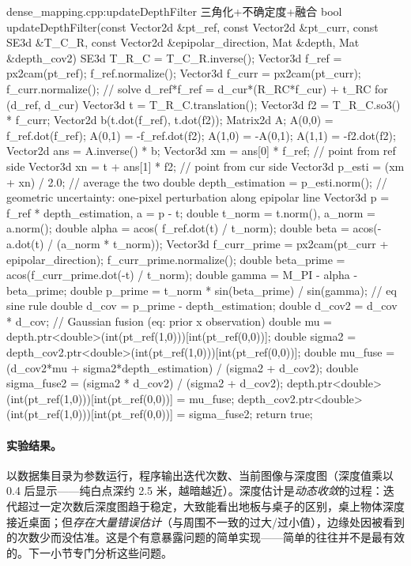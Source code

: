 \begin{codebox}[C++]{dense\_mapping.cpp:updateDepthFilter 三角化+不确定度+融合}
bool updateDepthFilter(const Vector2d &pt_ref, const Vector2d &pt_curr,
    const SE3d &T_C_R, const Vector2d &epipolar_direction,
    Mat &depth, Mat &depth_cov2) {
  SE3d T_R_C = T_C_R.inverse();
  Vector3d f_ref  = px2cam(pt_ref);  f_ref.normalize();
  Vector3d f_curr = px2cam(pt_curr); f_curr.normalize();
  // solve d_ref*f_ref = d_cur*(R_RC*f_cur) + t_RC  for (d_ref, d_cur)
  Vector3d t  = T_R_C.translation();
  Vector3d f2 = T_R_C.so3() * f_curr;
  Vector2d b(t.dot(f_ref), t.dot(f2));
  Matrix2d A;
  A(0,0) = f_ref.dot(f_ref); A(0,1) = -f_ref.dot(f2);
  A(1,0) = -A(0,1);          A(1,1) = -f2.dot(f2);
  Vector2d ans = A.inverse() * b;
  Vector3d xm = ans[0] * f_ref;          // point from ref side
  Vector3d xn = t + ans[1] * f2;         // point from cur side
  Vector3d p_esti = (xm + xn) / 2.0;     // average the two
  double depth_estimation = p_esti.norm();
  // geometric uncertainty: one-pixel perturbation along epipolar line
  Vector3d p = f_ref * depth_estimation, a = p - t;
  double t_norm = t.norm(), a_norm = a.norm();
  double alpha = acos( f_ref.dot(t) / t_norm);
  double beta  = acos(-a.dot(t) / (a_norm * t_norm));
  Vector3d f_curr_prime = px2cam(pt_curr + epipolar_direction);
  f_curr_prime.normalize();
  double beta_prime = acos(f_curr_prime.dot(-t) / t_norm);
  double gamma   = M_PI - alpha - beta_prime;
  double p_prime = t_norm * sin(beta_prime) / sin(gamma);  // eq sine rule
  double d_cov   = p_prime - depth_estimation;
  double d_cov2  = d_cov * d_cov;
  // Gaussian fusion (eq: prior x observation)
  double mu     = depth.ptr<double>(int(pt_ref(1,0)))[int(pt_ref(0,0))];
  double sigma2 = depth_cov2.ptr<double>(int(pt_ref(1,0)))[int(pt_ref(0,0))];
  double mu_fuse     = (d_cov2*mu + sigma2*depth_estimation) / (sigma2 + d_cov2);
  double sigma_fuse2 = (sigma2 * d_cov2) / (sigma2 + d_cov2);
  depth.ptr<double>(int(pt_ref(1,0)))[int(pt_ref(0,0))]      = mu_fuse;
  depth_cov2.ptr<double>(int(pt_ref(1,0)))[int(pt_ref(0,0))] = sigma_fuse2;
  return true;
}
\end{codebox}

\paragraph{实验结果。}
以数据集目录为参数运行，程序输出迭代次数、当前图像与深度图（深度值乘以 0.4 后显示——纯白点深约 2.5 米，越暗越近）。深度估计是\emph{动态收敛}的过程：迭代超过一定次数后深度图趋于稳定，大致能看出地板与桌子的区别，桌上物体深度接近桌面；但\emph{存在大量错误估计}（与周围不一致的过大/过小值），边缘处因被看到的次数少而没估准\cite{gaoxiang2019slam14}。这是个有意暴露问题的简单实现——简单的往往并不是最有效的。下一小节专门分析这些问题。

